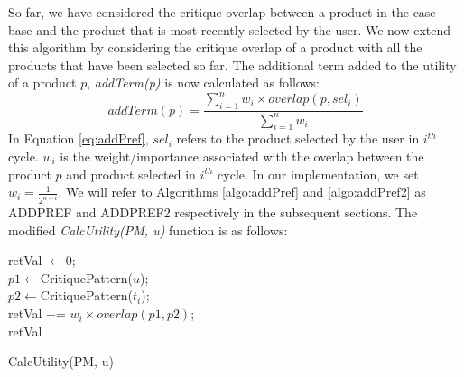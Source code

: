 So far, we have considered the critique overlap between a product in the case-base and the product that is most recently selected by the user.
We now extend this algorithm by considering the critique overlap of a product with all the products that have been selected so far.
The additional term added to the utility of a product $p$, \textit{addTerm(p)} is now calculated as follows:
\begin{equation}
\label{eq:addPref}
addTerm(p) = \frac{\sum_{i=1}^{n} {w_i \times overlap(p,sel_i)}} {\sum_{i=1}^{n}w_i}
\end{equation}
In Equation \ref{eq:addPref}, $sel_i$ refers to the product selected by the user in $i^{th}$ cycle.
$w_i$ is the weight/importance associated with the overlap between the product $p$ and product selected in $i^{th}$ cycle.
In our implementation, we set $w_i = \frac{1}{2^{n-i}}$.
We will refer to Algorithms \ref{algo:addPref} and \ref{algo:addPref2} as ADDPREF and ADDPREF2 respectively in the subsequent sections.
The modified \textit{CalcUtility(PM, u)} function is as follows:

\begin{algorithm}[ht]
  \DontPrintSemicolon

  retVal $\gets 0$;\\
   {
      $p1 \gets $CritiquePattern($u$);\\
      $p2 \gets $CritiquePattern($t_i$);\\
      retVal += $w_i \times overlap(p1, p2)$;\\
  }
  \Return retVal
  \caption{CalcUtility(PM, u)}
  \label{algo:addPref2}
\end{algorithm}

